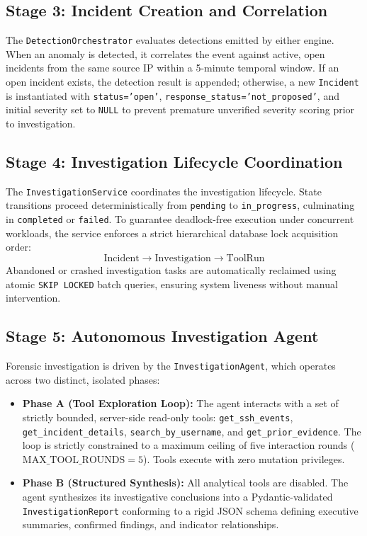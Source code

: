 \documentclass[conference]{IEEEtran}
\begin{document}
\subsection{Stage 3: Incident Creation and Correlation}
The \texttt{DetectionOrchestrator} evaluates detections emitted by either engine. When an anomaly is detected, it correlates the event against active, open incidents from the same source IP within a 5-minute temporal window. If an open incident exists, the detection result is appended; otherwise, a new \texttt{Incident} is instantiated with \texttt{status='open'}, \texttt{response\_status='not\_proposed'}, and initial severity set to \texttt{NULL} to prevent premature unverified severity scoring prior to investigation.

\subsection{Stage 4: Investigation Lifecycle Coordination}
The \texttt{InvestigationService} coordinates the investigation lifecycle. State transitions proceed deterministically from \texttt{pending} to \texttt{in\_progress}, culminating in \texttt{completed} or \texttt{failed}. To guarantee deadlock-free execution under concurrent workloads, the service enforces a strict hierarchical database lock acquisition order:
\begin{equation}
\text{Incident} \longrightarrow \text{Investigation} \longrightarrow \text{ToolRun}
\end{equation}
Abandoned or crashed investigation tasks are automatically reclaimed using atomic \texttt{SKIP LOCKED} batch queries, ensuring system liveness without manual intervention.

\subsection{Stage 5: Autonomous Investigation Agent}
Forensic investigation is driven by the \texttt{InvestigationAgent}, which operates across two distinct, isolated phases:
\begin{itemize}
    \item \textbf{Phase A (Tool Exploration Loop):} The agent interacts with a set of strictly bounded, server-side read-only tools: \texttt{get\_ssh\_events}, \texttt{get\_incident\_details}, \texttt{search\_by\_username}, and \texttt{get\_prior\_evidence}. The loop is strictly constrained to a maximum ceiling of five interaction rounds ($\text{MAX\_TOOL\_ROUNDS} = 5$). Tools execute with zero mutation privileges.
    \item \textbf{Phase B (Structured Synthesis):} All analytical tools are disabled. The agent synthesizes its investigative conclusions into a Pydantic-validated \texttt{InvestigationReport} conforming to a rigid JSON schema defining executive summaries, confirmed findings, and indicator relationships.
\end{itemize}
\end{document}
